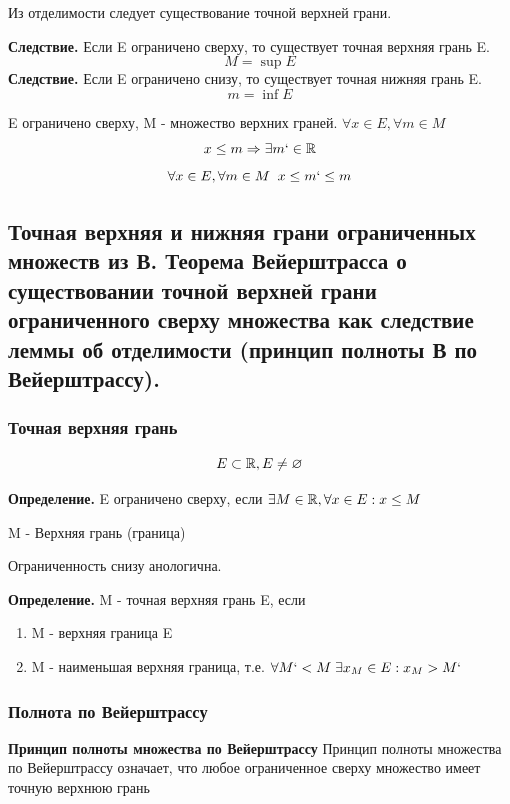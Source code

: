 \begin{tcolorbox}[title=Доказательство]
\begin{enumerate}
	\end{enumerate}
\end{tcolorbox}


Из отделимости следует существование точной верхней грани. 


\textbf{Следствие.} Если E ограничено сверху, то существует точная верхняя грань E. 
\[ M = \sup E \]
\textbf{Следствие.} Если E ограничено снизу, то существует точная нижняя грань E. 
\[ m = \inf E \]
\begin{tcolorbox}[title=Доказательство]
	E ограничено сверху, M - множество верхних граней. $\forall x \in E, \forall m \in M$
	\[ x \leq m \Rightarrow \exists m` \in \mathbb{R} \]
	\[ \forall x \in E, \forall m \in M \;\; x \leq m` \leq m \]
\end{tcolorbox}
\subsection{Точная верхняя и нижняя грани ограниченных множеств из В. Теорема Вейерштрасса о существовании точной верхней грани ограниченного сверху множества как следствие леммы об отделимости (принцип полноты В по Вейерштрассу).}

\subsubsection{Точная верхняя грань}
\[ E \subset \mathbb{R}, E \not=  \varnothing \]
\begin{tcolorbox}
	\textbf{Определение.} E ограничено сверху, если $\exists M \in \mathbb{R}, \forall x \in E: x \leq M$


	M - Верхняя грань (граница)
\end{tcolorbox}
Ограниченность снизу анологична.
\begin{tcolorbox}
	\textbf{Определение.} M - точная верхняя грань E, если 
	\begin{enumerate}
		\item M - верхняя граница E 
		\item M - наименьшая верхняя граница, т.е. $\forall M` < M\; \exists x_M \in E: x_M > M`$
			
	\end{enumerate}
\end{tcolorbox}

\subsubsection{Полнота по Вейерштрассу}
\begin{tcolorbox}
    \textbf{Принцип полноты множества по Вейерштрассу}
    Принцип полноты множества по Вейерштрассу означает, что любое ограниченное сверху множество имеет точную верхнюю грань     
\end{tcolorbox}

